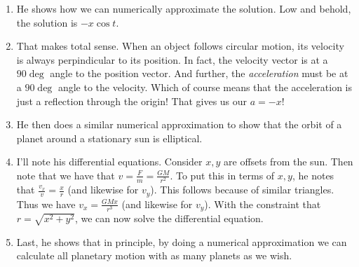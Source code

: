 \begin{enumerate}
  \item He shows how we can numerically approximate the solution. Low
  and behold, the solution is $-x \cos t$.

  \item That makes total sense. When an object follows circular motion,
  its velocity is always perpindicular to its position. In fact, the
  velocity vector is at a $90\deg$ angle to the position vector. And
  further, the \emph{acceleration} must be at a $90\deg$ angle to the
  velocity. Which of course means that the acceleration is just a
  reflection through the origin! That gives us our $a = -x$!

  \item He then does a similar numerical approximation to show that the
  orbit of a planet around a stationary sun is elliptical. 

  \item I'll note his differential equations. Consider $x, y$ are
  offsets from the sun. Then note that we have that $v = \frac{F}{m} =
  \frac{GM}{r^2}$. To put this in terms of $x, y$, he notes that
  $\frac{v_x}{v} = \frac{x}{r}$ (and likewise for $v_y$). This follows
  because of similar triangles. Thus we have $v_x = \frac{GMx}{r^3}$
  (and likewise for $v_y$). With the constraint that $r = \sqrt{x^2 +
  y^2}$, we can now solve the differential equation.

  \item Last, he shows that in principle, by doing a numerical
  approximation we can calculate all planetary motion with as many
  planets as we wish.

\end{enumerate}
